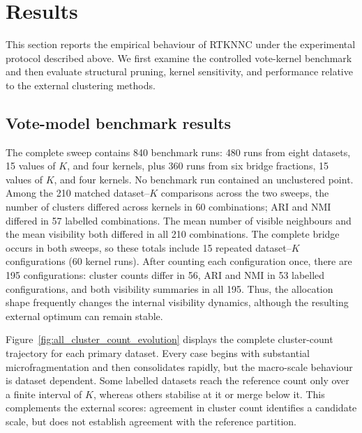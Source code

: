\documentclass[pdflatex,sn-basic,Numbered]{sn-jnl}
\begin{document}
\section{Results}\label{sec:results}

This section reports the empirical behaviour of RTKNNC under the experimental protocol described above. We first examine the controlled vote-kernel benchmark and then evaluate structural pruning, kernel sensitivity, and performance relative to the external clustering methods.

\subsection{Vote-model benchmark results}\label{sec:vote_results}

The complete sweep contains 840 benchmark runs: 480 runs from eight datasets, 15 values of $K$, and four kernels, plus 360 runs from six bridge fractions, 15 values of $K$, and four kernels. No benchmark run contained an unclustered point. Among the 210 matched dataset--$K$ comparisons across the two sweeps, the number of clusters differed across kernels in 60 combinations; ARI and NMI differed in 57 labelled combinations. The mean number of visible neighbours and the mean visibility both differed in all 210 combinations. The complete bridge occurs in both sweeps, so these totals include 15
repeated dataset--$K$ configurations (60 kernel runs). After counting each
configuration once, there are 195 configurations: cluster counts differ in
56, ARI and NMI in 53 labelled configurations, and both visibility summaries
in all 195. Thus, the allocation shape frequently changes the internal
visibility dynamics, although the resulting external optimum can remain stable.

Figure~\ref{fig:all_cluster_count_evolution} displays the complete cluster-count
trajectory for each primary dataset.  Every case begins with substantial
microfragmentation and then consolidates rapidly, but the macro-scale behaviour
is dataset dependent.  Some labelled datasets reach the reference count only
over a finite interval of $K$, whereas others stabilise at it or merge below it.
This complements the external scores: agreement in cluster count identifies a
candidate scale, but does not establish agreement with the reference partition.
\end{document}
